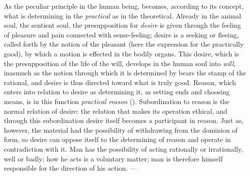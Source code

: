 As the peculiar principle in the human being,  becomes, according to its concept, what is determining in the \emph{practical} as in the theoretical. Already in the animal soul, the sentient soul, the presupposition for \emph{desire} is given through the feeling of pleasure and pain connected with sense-feeling; desire is a seeking or fleeing, called forth by the notion of the pleasant (here the expression for the practically good), by which a motion is effected in the bodily organs. This desire, which is the presupposition of the life of the will, develops in the human soul into \emph{will}, inasmuch as the notion through which it is determined by  bears the stamp of the rational, and desire is thus directed toward what is truly good. Reason, which enters into relation to desire as determining it, as setting ends and choosing means, is in this function \emph{practical reason} (). Subordination to reason is the normal relation of desire: the relation that makes its operation ethical, and through this subordination desire itself becomes a participant in reason. Just as, however, the material had the possibility of withdrawing from the dominion of form, so desire can oppose itself to the determining of reason and operate in contradiction with it. Man has the possibility of acting rationally or irrationally, well or badly; how he acts is a voluntary matter; man is therefore himself responsible for the direction of his action. ---


